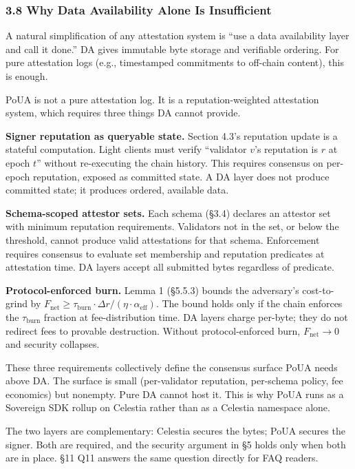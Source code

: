 \documentclass[
  11pt,
]{article}
\newcounter{none} %
\begin{document}
\subsubsection{3.8 Why Data Availability Alone Is
Insufficient}\label{why-data-availability-alone-is-insufficient}

A natural simplification of any attestation system is ``use a data
availability layer and call it done.'' DA gives immutable byte storage
and verifiable ordering. For pure attestation logs (e.g., timestamped
commitments to off-chain content), this is enough.

PoUA is not a pure attestation log. It is a reputation-weighted
attestation system, which requires three things DA cannot provide.

\textbf{Signer reputation as queryable state.} Section 4.3's reputation
update is a stateful computation. Light clients must verify ``validator
\(v\)'s reputation is \(r\) at epoch \(t\)'' without re-executing the
chain history. This requires consensus on per-epoch reputation, exposed
as committed state. A DA layer does not produce committed state; it
produces ordered, available data.

\textbf{Schema-scoped attestor sets.} Each schema (§3.4) declares an
attestor set with minimum reputation requirements. Validators not in the
set, or below the threshold, cannot produce valid attestations for that
schema. Enforcement requires consensus to evaluate set membership and
reputation predicates at attestation time. DA layers accept all
submitted bytes regardless of predicate.

\textbf{Protocol-enforced burn.} Lemma 1 (§5.5.3) bounds the adversary's
cost-to-grind by
\(F_{\text{net}} \geq \tau_{\text{burn}} \cdot \Delta r / (\eta \cdot \alpha_{\text{eff}})\).
The bound holds only if the chain enforces the \(\tau_{\text{burn}}\)
fraction at fee-distribution time. DA layers charge per-byte; they do
not redirect fees to provable destruction. Without protocol-enforced
burn, \(F_{\text{net}} \to 0\) and security collapses.

These three requirements collectively define the consensus surface PoUA
needs above DA. The surface is small (per-validator reputation,
per-schema policy, fee economics) but nonempty. Pure DA cannot host it.
This is why PoUA runs as a Sovereign SDK rollup on Celestia rather than
as a Celestia namespace alone.

The two layers are complementary: Celestia secures the bytes; PoUA
secures the signer. Both are required, and the security argument in §5
holds only when both are in place. §11 Q11 answers the same question
directly for FAQ readers.
\end{document}
